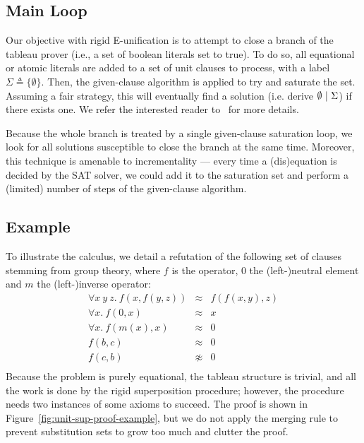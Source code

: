 
\subsection{Main Loop}

Our objective with rigid E-unification is to attempt to close a branch
of the tableau prover (i.e., a set of boolean literals set to true).
To do so, all equational or atomic literals are added to a set of unit clauses
to process, with a label $\Sigma \triangleq \{ \emptyset \}$.
Then, the given-clause algorithm is applied to try and saturate the set.
Assuming a fair strategy, this will eventually find a solution
(i.e. derive $\emptyset  ~|~ \Sigma$) if there exists one.
We refer the interested reader to~\cite{e_brainiac_prover} for more details.

Because the whole branch is treated by a single given-clause saturation loop,
we look for all solutions susceptible to close the branch at the same time.
Moreover, this technique is amenable to incrementality --- every time a
(dis)equation is decided by the SAT solver, we could add it to the saturation
set and perform a (limited) number of steps of the given-clause algorithm.


\subsection{Example}

To illustrate the calculus, we detail a refutation of the following set
of clauses stemming from group theory, where $f$ is the operator, $0$ the
(left-)neutral element and $m$ the (left-)inverse operator:
\[
  \begin{array}{rcl}
    \forall x~y~z.~ f(x,f(y,z)) &\approx& f(f(x,y),z) \\
    \forall x.~ f(0,x) &\approx& x \\
    \forall x.~ f(m(x),x) &\approx& 0 \\
    f(b,c) &\approx& 0 \\
    f(c,b) &\not\approx& 0 \\
  \end{array}
\]
Because the problem is purely equational, the tableau structure is trivial,
and all the work is done by the rigid superposition procedure;
however, the procedure needs two instances of some axioms to succeed.
The proof is shown in Figure~\ref{fig:unit-sup-proof-example}, but we
do not apply the merging rule to prevent substitution sets to grow too much
and clutter the proof.

